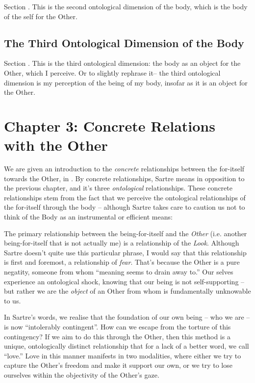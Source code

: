 Section \autocite[453 -- 468]{sartre}. This is the second ontological dimension of the body, which is the body of the self for the Other.

\subsection{The Third Ontological Dimension of the Body}

Section \autocite[468 -- 478]{sartre}. This is the third ontological dimension: the body as an object for the Other, which I perceive. Or to slightly rephrase it-- the third ontological dimension is my perception of the being of my body, insofar as it is an object for the Other.

\section{Chapter 3: Concrete Relations with the Other}

We are given an introduction to the \emph{concrete} relationships between the for-itself towards the Other, in \autocite[479 -- 482]{sartre}. By concrete relationships, Sartre means in opposition to the previous chapter, and it's three \emph{ontological} relationships. These concrete relationships stem from the fact that we perceive the ontological relationships of the for-itself through the body -- although Sartre takes care to caution us not to think of the Body as an instrumental or efficient means: 

\noindent
The primary relationship between the being-for-itself and the \emph{Other} (i.e. another being-for-itself that is not actually me) is a relationship of the \emph{Look}. Although Sartre doesn't quite use this particular phrase, I would say that this relationship is first and foremost, a relationship of \emph{fear}. That's because the Other is a pure negatity, someone from whom \enquote{meaning seems to drain away to.} Our selves experience an ontological shock, knowing that our being is not self-supporting -- but rather we are the \emph{object} of an Other from whom is fundamentally unknowable to us. 

In Sartre's words, we realise that the foundation of our own being -- who we are -- is now \enquote{intolerably contingent}. How can we escape from the torture of this contingency? If we aim to do this through the Other, then this method is a unique, ontologically distinct relationship that for a lack of a better word, we call \enquote{love.} Love in this manner manifests in two modalities, where either we try to capture the Other's freedom and make it support our own, or we try to lose ourselves within the objectivity of the Other's gaze.

